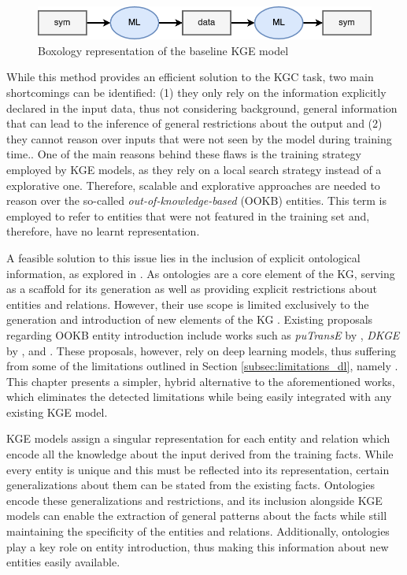 \begin{figure}
    \centering
    \includegraphics[width=\linewidth]{5_kbsintegrationdl/figures/boxology_krintodl_base.png}
    \caption{Boxology representation of the baseline KGE model}
    \label{fig:box_krintodl_base}
\end{figure}


While this method provides an efficient solution to the KGC task, two main shortcomings can be identified: (1) they only rely on the information explicitly declared in the input data, thus not considering background, general information that can lead to the inference of general restrictions about the output and (2) they cannot reason over inputs that were not seen by the model during training time.. One of the main reasons behind these flaws is the training strategy employed by KGE models, as they rely on a local search strategy instead of a explorative one. Therefore, scalable and explorative approaches are needed to reason over the so-called \textit{out-of-knowledge-based} (OOKB) entities. This term is employed to refer to entities that were not featured in the training set and, therefore, have no learnt representation. 

A feasible solution to this issue lies in the inclusion of explicit ontological information, as explored in \cite{Patrick}. As ontologies are a core element of the KG, serving as a scaffold for its generation as well as providing explicit restrictions about entities and relations. However, their use scope is limited exclusively to the generation and introduction of new elements of the KG \citep{paulheim2017knowledge}. Existing proposals regarding OOKB entity introduction include works such as \textit{puTransE} by \cite{putranse}, \textit{DKGE} by \cite{dkge}, \cite{hamaguchi_etal} and \cite{shah_open-world_2019}. These proposals, however, rely on deep learning models, thus suffering from some of the limitations outlined in Section \ref{subsec:limitations_dl}, namely . This chapter presents a simpler, hybrid alternative to the aforementioned works, which eliminates the detected limitations while being easily integrated with any existing KGE model.

KGE models assign a singular representation for each entity and relation which encode all the knowledge about the input derived from the training facts. While every entity is unique and this must be reflected into its representation, certain generalizations about them can be stated from the existing facts. Ontologies encode these generalizations and restrictions, and its inclusion alongside KGE models can enable the extraction of general patterns about the facts while still maintaining the specificity of the entities and relations. Additionally, ontologies play a key role on entity introduction, thus making this information about new entities easily available.

